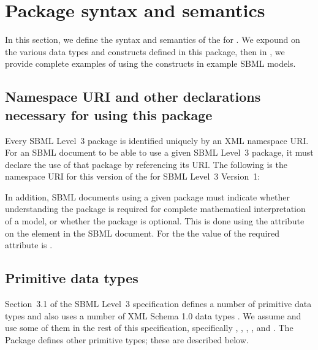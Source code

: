 \section{Package syntax and semantics}

In this section, we define the syntax and semantics of the \FooPackage
for \sbmlthreecore. We expound on the various data types and constructs
defined in this package, then in , we provide complete
examples of using the constructs in example SBML models.

\subsection{Namespace URI and other declarations necessary for using
this package}
\label{xml-namespace}

Every SBML Level~3 package is identified uniquely by an XML namespace
URI. For an SBML document to be able to use a given SBML Level~3
package, it must declare the use of that package by referencing its URI.
The following is the namespace URI for this version of the \FooPackage
for SBML Level~3 Version~1:

\begin{center}
\end{center}

In addition, SBML documents using a given package must indicate whether
understanding the package is required for complete mathematical
interpretation of a model, or whether the package is optional. This is
done using the attribute  on the  element
in the SBML document. For the \FooPackage the value of the required
attribute is .


\subsection{Primitive data types}
\label{primitive-types}

Section~3.1 of the SBML Level~3 specification defines a number of
primitive data types and also uses a number of XML Schema 1.0 data types
\citep{biron:2000}. We assume and use some of them in the rest of this
specification, specifically , ,
, , and . The \Foo
Package defines other primitive types; these are described below.

